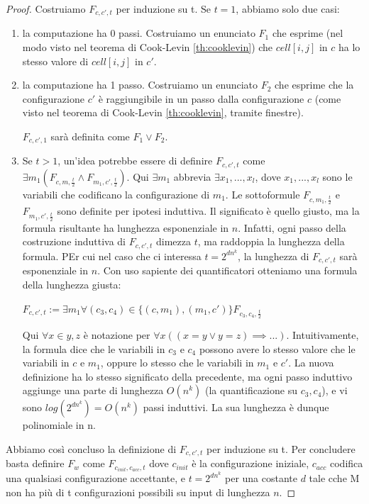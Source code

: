 \documentclass[a4paper, 12pt]{article}
\begin{document}
\begin{proof}
Costruiamo $F_{c,c',t}$ per induzione su t. Se $t=1$, abbiamo solo due casi:
\begin{enumerate}
\item la computazione ha 0 passi. Costruiamo un enunciato $F_1$ che esprime (nel modo visto nel teorema di Cook-Levin \ref{th:cooklevin}) che $cell[i,j]$ in $c$ ha lo stesso valore di $cell[i,j]$ in $c'$.
\item la computazione ha 1 passo. Costruiamo un enunciato $F_2$ che esprime che la configurazione $c'$ \`e raggiungibile in un passo dalla configurazione $c$ (come visto nel teorema di Cook-Levin \ref{th:cooklevin}, tramite finestre).
\begin{center}
$F_{c,c',1}$ sar\`a definita come $F_1 \lor F_2$.
\end{center}
\item Se $t > 1$, un'idea potrebbe essere di definire $F_{c,c',t}$ come $\exists m_1 (F_{c,m,\frac{t}{2}} \land F_{m_1, c', \frac{t}{2}})$. Qui $\exists m_1$ abbrevia $\exists x_1,...,x_l$, dove $x_1,...,x_l$ sono le variabili che codificano la configurazione di $m_1$. Le sottoformule $F_{c,m_1,\frac{t}{2}}$ e $F_{m_1,c',\frac{t}{2}}$ sono definite per ipotesi induttiva. Il significato \`e quello giusto, ma la formula risultante ha lunghezza esponenziale in $n$. Infatti, ogni passo della costruzione induttiva di $F_{c,c',t}$ dimezza $t$, ma raddoppia la lunghezza della formula. PEr cui nel caso che ci interessa $t = 2^{dn^k}$, la lunghezza di $F_{c,c',t}$ sar\`a esponenziale in $n$. Con uso sapiente dei quantificatori otteniamo una formula della lunghezza giusta:
\begin{center}
$F_{c,c',t} := \exists m_1 \forall (c_3, c_4) \in \{(c,m_1),(m_1,c')\} F_{c_3,c_4,\frac{t}{2}}$
\end{center}
Qui $\forall x \in {y,z}$ \`e notazione per $\forall x ((x = y \lor y = z) \implies ...)$. Intuitivamente, la formula dice che le variabili in $c_3$ e $c_4$ possono avere lo stesso valore che le variabili in $c$ e $m_1$, oppure lo stesso che le variabili in $m_1$ e $c'$. La nuova definizione ha lo stesso significato della precedente, ma ogni passo induttivo aggiunge una parte di lunghezza $O(n^k)$ (la quantificazione su $c_3, c_4$), e vi sono $log(2^{dn^k}) = O(n^k)$ passi induttivi. La sua lunghezza \`e dunque polinomiale in n.
\end{enumerate}
Abbiamo cos\`i concluso la definizione di $F_{c,c',t}$ per induzione su t. Per concludere basta definire $F_w$ come $F_{c_{init}, c_{acc}, t}$ dove $c_{init}$ \`e la configurazione iniziale, $c_{acc}$ codifica una qualsiasi configurazione accettante, e $t = 2^{dn^k}$ per una costante $d$ tale cche M non ha pi\`u di t configurazioni possibili su input di lunghezza $n$.
\end{proof}
\end{document}
